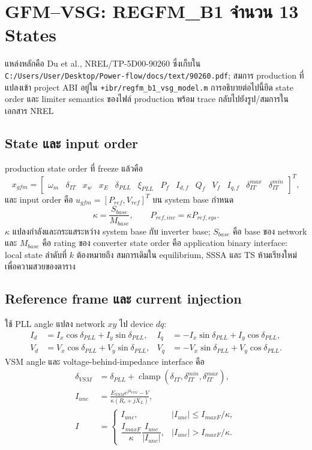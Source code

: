 \documentclass[12pt,a4paper]{article}
\newcommand{\clamp}{\operatorname{clamp}}
\begin{document}
\section{GFM--VSG: REGFM\_B1 จำนวน 13 States}

แหล่งหลักคือ Du et al., NREL/TP-5D00-90260 ซึ่งเก็บใน
\nolinkurl{C:/Users/User/Desktop/Power-flow/docs/text/90260.pdf};
สมการ production ที่แปลงเข้า project ABI อยู่ใน
\nolinkurl{+ibr/regfm_b1_vsg_model.m} การอธิบายต่อไปนี้ยึด state order และ limiter
semantics ของไฟล์ production พร้อม trace กลับไปยังรูป/สมการในเอกสาร NREL

\subsection{State และ input order}

production state order ที่ freeze แล้วคือ
\begin{equation}
x_{gfm}=\begin{bmatrix}
\omega_m&\delta_{IT}&x_w&x_E&\delta_{PLL}&\xi_{PLL}&
P_f&I_{d,f}&Q_f&V_f&I_{q,f}&\delta_{IT}^{max}&\delta_{IT}^{min}
\end{bmatrix}^{T},
\end{equation}
และ input order คือ $u_{gfm}=[P_{ref},V_{ref}]^T$ บน system base
กำหนด
\begin{equation}
\kappa=\frac{S_{base}}{M_{base}},\qquad
P_{ref,inv}=\kappa P_{ref,sys}.
\end{equation}
$\kappa$ แปลงกำลังและกระแสระหว่าง system base กับ inverter base;
$S_{base}$ คือ base ของ network และ $M_{base}$ คือ rating ของ converter
state order คือ application binary interface: local state ลำดับที่ $k$ ต้องหมายถึง
สมการเดิมใน equilibrium, SSSA และ TS ห้ามเรียงใหม่เพื่อความสวยของตาราง

\subsection{Reference frame และ current injection}

ใช้ PLL angle แปลง network $xy$ ไป device $dq$:
\begin{align}
I_d&=I_x\cos\delta_{PLL}+I_y\sin\delta_{PLL},&
I_q&=-I_x\sin\delta_{PLL}+I_y\cos\delta_{PLL},\\
V_d&=V_x\cos\delta_{PLL}+V_y\sin\delta_{PLL},&
V_q&=-V_x\sin\delta_{PLL}+V_y\cos\delta_{PLL}.
\end{align}
VSM angle และ voltage-behind-impedance interface คือ
\begin{align}
\delta_{VSM}&=\delta_{PLL}+\clamp(\delta_{IT},\delta_{IT}^{min},\delta_{IT}^{max}),\\
I_{unc}&=\frac{E_{VSM}e^{j\delta_{VSM}}-V}{\kappa(R_e+jX_L)},\\
I&=\begin{cases}
I_{unc},& |I_{unc}|\le I_{maxF}/\kappa,\\
\dfrac{I_{maxF}}{\kappa}\dfrac{I_{unc}}{|I_{unc}|},& |I_{unc}|>I_{maxF}/\kappa.
\end{cases}
\end{align}
\end{document}
